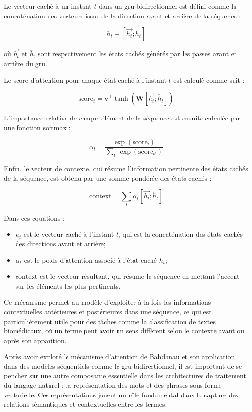 \documentclass[12pt]{report}
\begin{document}
Le vecteur caché à un instant \( t \) dans un \gls{gru} bidirectionnel est défini comme la concaténation des vecteurs issus de la direction avant et arrière de la séquence :

\[
h_t = [\overrightarrow{h_t}; \overleftarrow{h_t}]
\]

où \( \overrightarrow{h_t} \) et \( \overleftarrow{h_t} \) sont respectivement les états cachés générés par les passes avant et arrière du \gls{gru}.

Le score d'attention pour chaque état caché à l'instant \( t \) est calculé comme suit :

\[
\text{score}_t = \mathbf{v}^\top \tanh(\mathbf{W} [\overrightarrow{h_t}; \overleftarrow{h_t}])
\]

L'importance relative de chaque élément de la séquence est ensuite calculée par une fonction softmax :

\[
\alpha_t = \frac{\exp(\text{score}_t)}{\sum_{t'} \exp(\text{score}_{t'})}
\]

Enfin, le vecteur de contexte, qui résume l'information pertinente des états cachés de la séquence, est obtenu par une somme pondérée des états cachés :

\[
\text{context} = \sum_t \alpha_t [\overrightarrow{h_t}; \overleftarrow{h_t}]
\]

Dans ces équations :

\begin{itemize}
    \item \( h_t \) est le vecteur caché à l’instant \( t \), qui est la concaténation des états cachés des directions avant et arrière;
    \item \( \alpha_t \) est le poids d’attention associé à l’état caché \( h_t \);
    \item \( \text{context} \) est le vecteur résultant, qui résume la séquence en mettant l’accent sur les éléments les plus pertinents.
\end{itemize}

Ce mécanisme permet au modèle d'exploiter à la fois les informations contextuelles antérieures et postérieures dans une séquence, ce qui est particulièrement utile pour des tâches comme la classification de textes biomédicaux, où un terme peut avoir un sens différent selon le contexte avant ou après son apparition.
\newline

Après avoir exploré le mécanisme d'attention de Bahdanau et son application dans des modèles séquentiels comme le \gls{gru} bidirectionnel, il est important de se pencher sur une autre composante essentielle dans les architectures de traitement du langage naturel : la représentation des mots et des phrases sous forme vectorielle. Ces représentations jouent un rôle fondamental dans la capture des relations sémantiques et contextuelles entre les termes.
\end{document}
